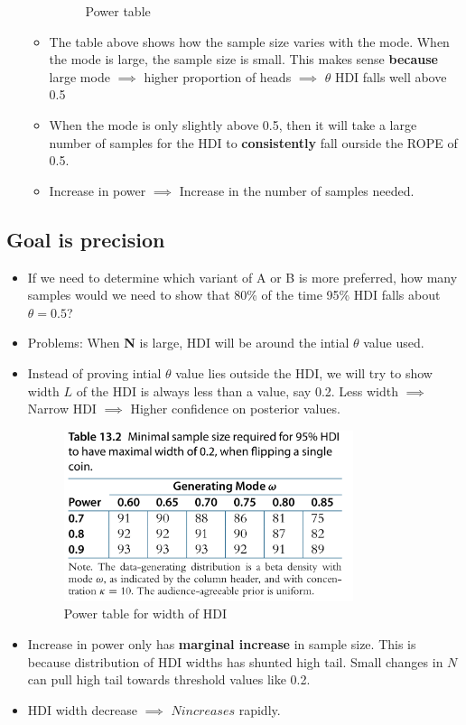 \documentclass[a4paper]{article}
\begin{document}
\begin{itemize}
\begin{itemize}
\begin{figure}[H]
                    \caption{Power table}
                    \label{fig:power_table}
                \end{figure}
            \item The table above shows how the sample size varies with the mode. When the mode is large, the sample size is small. This makes sense \textbf{because} large mode $\implies$ higher proportion of heads $\implies$ $\theta$ HDI falls well above 0.5
            \item When the mode is only slightly above 0.5, then it will take a large number of samples for the HDI to \textbf{consistently} fall ourside the ROPE of 0.5.
            \item Increase in power $\implies$ Increase in the number of samples needed.
        \end{itemize}
\end{itemize}

\subsection{Goal is precision}
\begin{itemize}
    \item If we need to determine which variant of A or B is more preferred, how many samples would we need to show that 80\% of the time 95\% HDI falls about $\theta=0.5$?
    \item Problems: When \textbf{N} is large, HDI will be around the intial $\theta$ value used. 
    \item Instead of proving intial $\theta$ value lies outside the HDI, we will try to show width $L$ of the HDI is always less than a value, say 0.2. Less width $\implies$ Narrow HDI $\implies$ Higher confidence on posterior values.
    \begin{figure}[H]
        \centering
        \includegraphics[width=0.8\textwidth]{width_power_table}
        \caption{Power table for width of HDI}
        \label{fig:}
    \end{figure}
    \item Increase in power only has \textbf{marginal increase} in sample size. This is because distribution of HDI widths has shunted high tail. Small changes in $N$ can pull high tail towards threshold values like 0.2. 
    \item HDI width decrease $\implies$ $N increases$ rapidly. 
\end{itemize}
\end{document}
